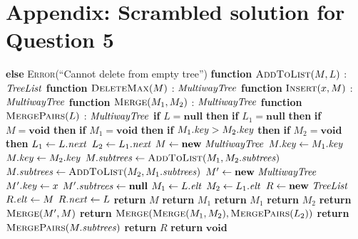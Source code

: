 \documentclass[11pt]{article}
\newcommand{\id}[1]{\mbox{\textit{#1}}}
\begin{document}
\section*{Appendix: Scrambled solution for Question 5}
\begin{algorithmic}
\State \textbf{else}
\State \textsc{Error}(``Cannot delete from empty tree'')
\State \textbf{function} $\textsc{AddToList}(M,L)$ : $\id{TreeList}$
\State \textbf{function} $\textsc{DeleteMax}(M)$ : $\id{MultiwayTree}$
\State \textbf{function} $\textsc{Insert}(x,M)$ : $\id{MultiwayTree}$
\State \textbf{function} $\textsc{Merge}(M_1,M_2)$ : $\id{MultiwayTree}$
\State \textbf{function} $\textsc{MergePairs}(L)$ : $\id{MultiwayTree}$
\State \textbf{if} $L = \mathbf{null}$ \textbf{then}
\State \textbf{if} $L_1 = \mathbf{null}$ \textbf{then}
\State \textbf{if} $M = \mathbf{void}$ \textbf{then}
\State \textbf{if} $M_1 = \mathbf{void}$ \textbf{then}
\State \textbf{if} $M_1.\id{key} > M_2.\id{key}$ \textbf{then}
\State \textbf{if} $M_2 = \mathbf{void}$ \textbf{then}
\State $L_1 \gets L.\id{next}$
\State $L_2 \gets L_1.\id{next}$
\State $M \gets \mathbf{new}\ \id{MultiwayTree}$
\State $M.\id{key} \gets M_1.\id{key}$
\State $M.\id{key} \gets M_2.\id{key}$
\State $M.\id{subtrees} \gets \textsc{AddToList}(M_1,M_2.\id{subtrees})$
\State $M.\id{subtrees} \gets \textsc{AddToList}(M_2,M_1.\id{subtrees})$
\State $M' \gets \mathbf{new}\ \id{MultiwayTree}$
\State $M'.\id{key} \gets x$
\State $M'.\id{subtrees} \gets \mathbf{null}$
\State $M_1 \gets L.\id{elt}$
\State $M_2 \gets L_1.\id{elt}$
\State $R \gets \mathbf{new}\ \id{TreeList}$
\State $R.\id{elt} \gets M$
\State $R.\id{next} \gets L$
\State \textbf{return} $M$
\State \textbf{return} $M_1$
\State \textbf{return} $M_1$
\State \textbf{return} $M_2$
\State \textbf{return} $\textsc{Merge}(M',M)$
\State \textbf{return}
       $\textsc{Merge}(\textsc{Merge}(M_1,M_2),\textsc{MergePairs}(L_2))$
\State \textbf{return} $\textsc{MergePairs}(M.\id{subtrees})$
\State \textbf{return} $R$
\State \textbf{return} $\mathbf{void}$
\end{algorithmic}
\end{document}
